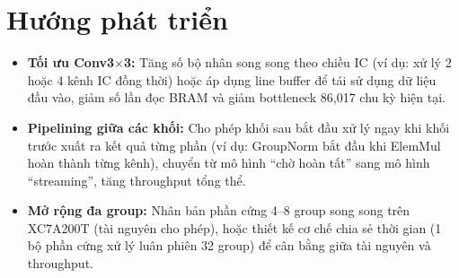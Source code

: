\documentclass{uetgraduation}
\begin{document}
\section{Hướng phát triển}

\begin{itemize}
    \item \textbf{Tối ưu Conv3$\times$3:} Tăng số bộ nhân song song theo chiều IC
    (ví dụ: xử lý 2 hoặc 4 kênh IC đồng thời) hoặc áp dụng line buffer để tái sử
    dụng dữ liệu đầu vào, giảm số lần đọc BRAM và giảm bottleneck 86{,}017 chu kỳ
    hiện tại.

    \item \textbf{Pipelining giữa các khối:} Cho phép khối sau bắt đầu xử lý ngay
    khi khối trước xuất ra kết quả từng phần (ví dụ: GroupNorm bắt đầu khi ElemMul
    hoàn thành từng kênh), chuyển từ mô hình ``chờ hoàn tất'' sang mô hình
    ``streaming'', tăng throughput tổng thể.

    \item \textbf{Mở rộng đa group:} Nhân bản phần cứng 4--8 group song song trên
    XC7A200T (tài nguyên cho phép), hoặc thiết kế cơ chế chia sẻ thời gian (1 bộ
    phần cứng xử lý luân phiên 32 group) để cân bằng giữa tài nguyên và throughput.

\end{itemize}
\end{document}

